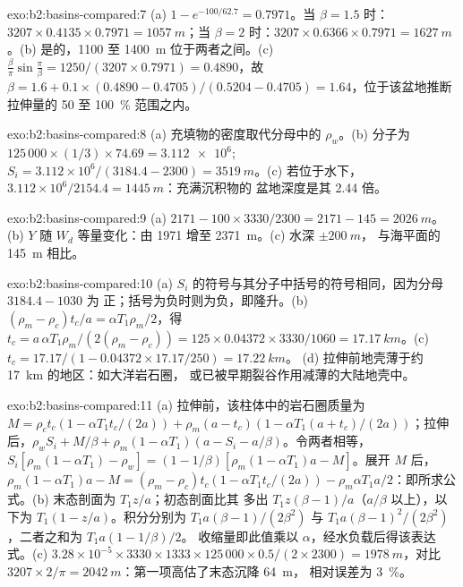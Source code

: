 \begin{solution}{exo:b2:basins-compared:7}
(a) $1 - e^{-100/62.7} = 0.7971$。当 $\beta = 1.5$ 时：$3207\times0.4135\times0.7971 =
\qty{1057}{m}$；当 $\beta = 2$ 时：$3207\times0.6366\times0.7971 = \qty{1627}{m}$。(b) 是的，1100 至
\qty{1400}{m} 位于两者之间。(c) $\frac{\beta}{\pi}\sin\frac{\pi}{\beta} = 1250/(3207\times0.7971)
= 0.4890$，故 $\beta = 1.6 + 0.1\times(0.4890 - 0.4705)/(0.5204 - 0.4705) = 1.64$，位于该盆地推断拉伸量的
50 至 \qty{100}{\percent} 范围之内。
\end{solution}

\begin{solution}{exo:b2:basins-compared:8}
(a) 充填物的密度取代分母中的 $\rho_w$。(b) 分子为
$125\,000\times(1/3)\times74.69 = \num{3.112e6}$; $S_i = 3.112\times10^{6}/(3184.4 - 2300) =
\qty{3519}{m}$。(c) 若位于水下，$3.112\times10^{6}/2154.4 = \qty{1445}{m}$：充满沉积物的
盆地深度是其 2.44 倍。
\end{solution}

\begin{solution}{exo:b2:basins-compared:9}
(a) $2171 - 100\times3330/2300 = 2171 - 145 = \qty{2026}{m}$。(b) $Y$ 随
$W_d$ 等量变化：由 1971 增至 \qty{2371}{m}。(c) 水深 $\pm\qty{200}{m}$，
与海平面的 \qty{145}{m} 相比。
\end{solution}

\begin{solution}{exo:b2:basins-compared:10}
(a) $S_i$ 的符号与其分子中括号的符号相同，因为分母 $3184.4 - 1030$ 为
正；括号为负时则为负，即隆升。(b) $(\rho_m - \rho_c)t_c/a =
\alpha T_1\rho_m/2$，得 $t_c = a\,\alpha T_1\rho_m/(2(\rho_m - \rho_c)) = 125\times0.04372\times
3330/1060 = \qty{17.17}{km}$。(c) $t_c = 17.17/(1 - 0.04372\times17.17/250) = \qty{17.22}{km}$。
(d) 拉伸前地壳薄于约 \qty{17}{km} 的地区：如大洋岩石圈，
或已被早期裂谷作用减薄的大陆地壳中。
\end{solution}

\begin{solution}{exo:b2:basins-compared:11}
(a) 拉伸前，该柱体中的岩石圈质量为 $M = \rho_c t_c(1 - \alpha T_1
t_c/(2a)) + \rho_m(a - t_c)(1 - \alpha T_1(a + t_c)/(2a))$；拉伸后，$\rho_w S_i + M/\beta +
\rho_m(1 - \alpha T_1)(a - S_i - a/\beta)$。令两者相等，$S_i[\rho_m(1 - \alpha T_1) - \rho_w] =
(1 - 1/\beta)[\rho_m(1 - \alpha T_1)a - M]$。展开 $M$ 后，$\rho_m(1 - \alpha T_1)a - M =
(\rho_m - \rho_c)t_c(1 - \alpha T_1 t_c/(2a)) - \rho_m\alpha T_1 a/2$：即所求公式。(b) 末态剖面为 $T_1 z/a$；初态剖面比其
多出 $T_1 z(\beta - 1)/a$（$a/\beta$ 以上），以下为 $T_1(1 - z/a)$。积分分别为 $T_1
a(\beta - 1)/(2\beta^2)$ 与 $T_1 a(\beta - 1)^2/(2\beta^2)$，二者之和为 $T_1 a(1 - 1/\beta)/2$。
收缩量即此值乘以 $\alpha$，经水负载后得该表达式。(c) $3.28\times10^{-5}
\times3330\times1333\times125\,000\times0.5/(2\times2300) = \qty{1978}{m}$，对比 $3207\times
2/\pi = \qty{2042}{m}$：第一项高估了末态沉降 \qty{64}{m}，
相对误差为 \qty{3}{\percent}。
\end{solution}

